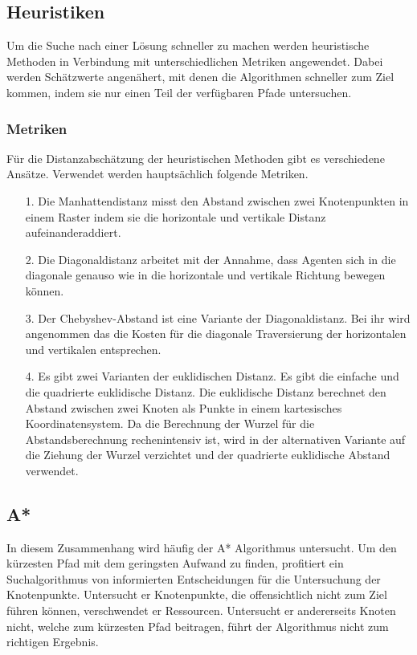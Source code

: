 \subsection{Heuristiken}
Um die Suche nach einer Lösung schneller zu machen werden heuristische Methoden in Verbindung mit unterschiedlichen Metriken angewendet. Dabei werden Schätzwerte angenähert, mit denen die Algorithmen schneller zum Ziel kommen, indem sie nur einen Teil der verfügbaren Pfade untersuchen\cite{RinaDechterandJudeaPearl.1983}.
\subsubsection{Metriken}
Für die Distanzabschätzung der heuristischen Methoden gibt es verschiedene Ansätze. Verwendet werden hauptsächlich folgende Metriken.

\begin{itemize}
\item[1.] Die Manhattendistanz misst den Abstand zwischen zwei Knotenpunkten in einem Raster indem sie die horizontale und vertikale Distanz aufeinanderaddiert.

\item[2.] Die Diagonaldistanz arbeitet mit der Annahme, dass Agenten sich in die diagonale genauso wie in die horizontale und vertikale Richtung bewegen können.

\item[3.] Der Chebyshev-Abstand ist eine Variante der Diagonaldistanz. Bei ihr wird angenommen das die Kosten für die diagonale Traversierung der horizontalen und vertikalen entsprechen.

\item[4.] Es gibt zwei Varianten der euklidischen Distanz. Es gibt die einfache und die quadrierte euklidische Distanz. Die euklidische Distanz berechnet den Abstand zwischen zwei Knoten als Punkte in einem kartesisches Koordinatensystem. Da die Berechnung der Wurzel für die Abstandsberechnung rechenintensiv ist, wird in der alternativen Variante auf die Ziehung der Wurzel verzichtet und der quadrierte euklidische Abstand verwendet\cite{You19}.

\end{itemize}
\subsection{A*} %
In diesem Zusammenhang wird häufig der A* Algorithmus untersucht. Um den kürzesten Pfad mit dem geringsten Aufwand zu finden, profitiert ein Suchalgorithmus von informierten Entscheidungen für die Untersuchung der Knotenpunkte. Untersucht er Knotenpunkte, die offensichtlich nicht zum Ziel führen können, verschwendet er Ressourcen. Untersucht er andererseits Knoten nicht, welche zum kürzesten Pfad beitragen, führt der Algorithmus nicht zum richtigen Ergebnis.

